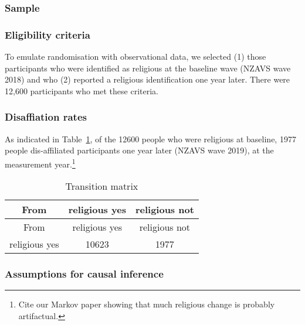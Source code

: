 \documentclass[
  letterpaper,
  DIV=11,
  numbers=noendperiod]{scrartcl}
\begin{document}
\hypertarget{sample}{%
\subsubsection{Sample}\label{sample}}

\hypertarget{eligibility-criteria}{%
\subsubsection{Eligibility criteria}\label{eligibility-criteria}}

To emulate randomisation with observational data, we selected (1) those
participants who were identified as religious at the baseline wave
(NZAVS wave 2018) and who (2) reported a religious identification one
year later. There were 12,600 participants who met these criteria.

\hypertarget{disaffiation-rates}{%
\subsubsection{Disaffiation rates}\label{disaffiation-rates}}

As indicated in Table~\ref{tbl-transition}, of the 12600 people who were
religious at baseline, 1977 people dis-affiliated participants one year
later (NZAVS wave 2019), at the measurement year.\footnote{Cite our
  Markov paper showing that much religious change is probably
  artifactual.}

\hypertarget{tbl-transition}{}
\begin{longtable}[]{@{}ccc@{}}
\caption{\label{tbl-transition}Transition matrix}\tabularnewline
\toprule\noalign{}
From & religious yes & religious not \\
\midrule\noalign{}
\endfirsthead
\toprule\noalign{}
From & religious yes & religious not \\
\midrule\noalign{}
\endhead
\bottomrule\noalign{}
\endlastfoot
religious yes & 10623 & 1977 \\
\end{longtable}

\hypertarget{assumptions-for-causal-inference}{%
\subsubsection{Assumptions for causal
inference}\label{assumptions-for-causal-inference}}
\end{document}
